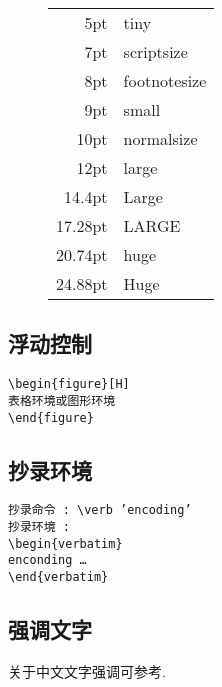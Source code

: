 \documentclass{zhart}
\begin{document}
\begin{figure}[H]
\begin{tabular}{rl}
\hline
5pt&\tiny{tiny}\\
7pt&\scriptsize{scriptsize}\\
8pt&\footnotesize{footnotesize}\\
9pt&\small{small}\\
10pt&\normalsize{normalsize}\\
12pt&\large{large}\\
14.4pt&\Large{Large}\\
17.28pt&\LARGE{LARGE}\\
20.74pt&\huge{huge}\\
24.88pt&\Huge{Huge}\\
\hline
\end{tabular}
\end{figure}

\newpage

\subsection{浮动控制}

\begin{verbatim}
\begin{figure}[H]
表格环境或图形环境
\end{figure}
\end{verbatim}

\subsection{抄录环境}

\noindent 
\texttt{抄录命令 : \textbackslash{}verb 'encoding'\\
抄录环境 : \\
\textbackslash begin\{verbatim\} \\
enconding \ldots\\
\textbackslash end\{verbatim\}
}

\subsection{强调文字}

关于中文文字强调可参考\cite{ctex2011}.
\end{document}
